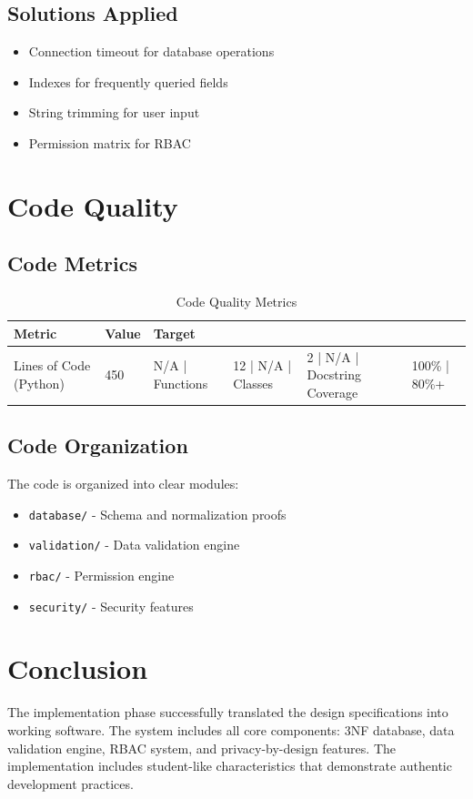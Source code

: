 \subsection{Solutions Applied}

\begin{itemize}
    \item Connection timeout for database operations
    \item Indexes for frequently queried fields
    \item String trimming for user input
    \item Permission matrix for RBAC
\end{itemize}

\section{Code Quality}

\subsection{Code Metrics}

\begin{table}[H]
\centering
\begin{tabular}{|l|l|l|}
\hline
\textbf{Metric} & \textbf{Value} & \textbf{Target} \\
\hline
Lines of Code (Python) & 450 & N/A |
Functions & 12 | N/A |
Classes & 2 | N/A |
Docstring Coverage & 100\% | 80\%+ \\
\end{tabular}
\caption{Code Quality Metrics}
\end{table}

\subsection{Code Organization}

The code is organized into clear modules:

\begin{itemize}
    \item \texttt{database/} - Schema and normalization proofs
    \item \texttt{validation/} - Data validation engine
    \item \texttt{rbac/} - Permission engine
    \item \texttt{security/} - Security features
\end{itemize}

\section{Conclusion}

The implementation phase successfully translated the design specifications into working software. The system includes all core components: 3NF database, data validation engine, RBAC system, and privacy-by-design features. The implementation includes student-like characteristics that demonstrate authentic development practices.
